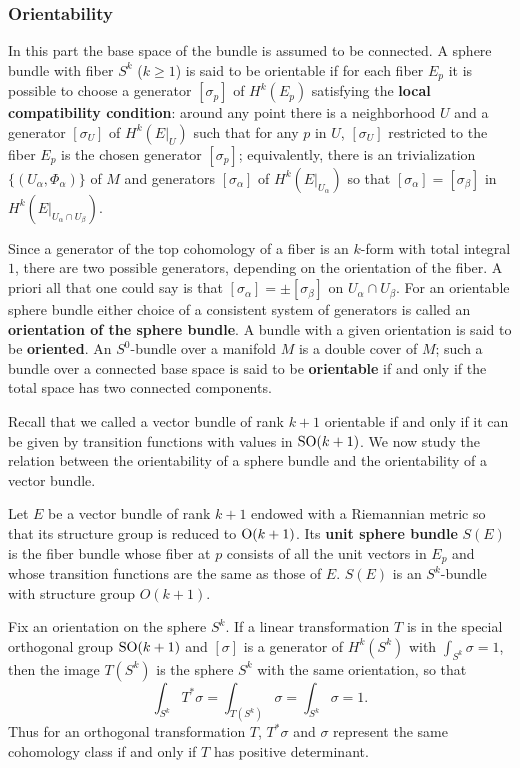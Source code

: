 \subsubsection{Orientability}
In this part the base space of the bundle is assumed to be connected. A sphere bundle with fiber $S^k$ ($k\geq 1$) is said to be orientable if for each fiber $E_p$ it 
is possible to choose a generator $[\sigma_p]$ of $H^k(E_p)$ satisfying the \textbf{local compatibility condition}: around any point there is a neighborhood $U$ and a 
generator $[\sigma_U]$ of $H^k(E|_U)$ such that for any $p$ in $U$, $[\sigma_U]$ restricted to the fiber $E_p$ is the chosen generator $[\sigma_p]$; equivalently, 
there is an trivialization $\{(U_\alpha,\varPhi_\alpha)\}$ of $M$ and generators $[\sigma_\alpha]$ of $H^k(E|_{U_\alpha})$ so that $[\sigma_\alpha]=[\sigma_\beta]$ in 
$H^k(E|_{U_\alpha\cap U_\beta})$.\par
Since a generator of the top cohomology of a fiber is an $k$-form with total integral $1$, there are two possible generators, depending on the orientation of the fiber. 
A priori all that one could say is that $[\sigma_\alpha]=\pm[\sigma_\beta]$ on $U_\alpha\cap U_\beta$. For an orientable sphere bundle either choice of a consistent 
system of generators is called an \textbf{orientation of the sphere bundle}. A bundle with a given orientation is said to be \textbf{oriented}. An $S^0$-bundle over a 
manifold $M$ is a double cover of $M$; such a bundle over a connected base space is said to be \textbf{orientable} if and only if the total space has two connected 
components.\par
Recall that we called a vector bundle of rank $k+1$ orientable if and only if it can be given by transition functions with values in $\mathrm{SO}(k+1)$. We now study the 
relation between the orientability of a sphere bundle and the orientability of a vector bundle.\par
Let $E$ be a vector bundle of rank $k+1$ endowed with a Riemannian metric so that its structure group is reduced to $\mathrm{O}(k+1)$. Its \textbf{unit sphere bundle} $S(E)$ 
is the fiber bundle whose fiber at $p$ consists of all the unit vectors in $E_p$ and whose transition functions are the same as those of $E$. $S(E)$ is an $S^k$-bundle 
with structure group $O(k+1)$.
\begin{remark}
Fix an orientation on the sphere $S^k$. If a linear transformation $T$ is in the special orthogonal group $\mathrm{SO}(k+1)$ and $[\sigma]$ is a generator of $H^k(S^k)$ 
with $\int_{S^k}\sigma=1$, then the image $T(S^k)$ is the sphere $S^k$ with the same orientation, so that
\[\int_{S^k}T^*\sigma=\int_{T(S^k)}\sigma=\int_{S^k}\sigma=1.\]
Thus for an orthogonal transformation $T$, $T^*\sigma$ and $\sigma$ represent the same cohomology class if and only if $T$ has positive determinant.
\end{remark}
